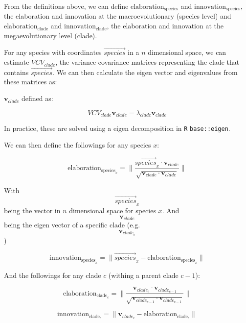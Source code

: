 \documentclass[12pt,a4paper]{article}
\begin{document}
From the definitions above, we can define $\text{elaboration}_{\text{species}}$ and $\text{innovation}_{\text{species}}$, the elaboration and innovation at the macroevolutionary (species level) and $\text{elaboration}_{\text{clade}}$ and $\text{innovation}_{\text{clade}}$, the elaboration and innovation at the megaevolutionary level (clade).

For any species with coordinates $\vec{species}$ in a $n$ dimensional space, we can estimate $VCV_{clade}$, the variance-covariance matrices representing the clade that contains $\vec{species}$.
We can then calculate the eigen vector and eigenvalues from these matrices as: 

$\textbf{v}_{clade}$ defined as:

\begin{equation}
VCV_{clade} \textbf{v}_{clade} = \lambda_{clade} \textbf{v}_{clade}
\end{equation}

In practice, these are solved using a eigen decomposition in \texttt{R} \texttt{base::eigen}.

We can then define the followings for any species $x$:

\begin{equation}
\text{elaboration}_{\text{species}_{x}} = \|\frac{\vec{species}_{x} \cdot \textbf{v}_{clade}} {\sqrt{\textbf{v}_{clade} \cdot \textbf{v}_{clade}}}\|
\end{equation}

With $$\vec{species}_{x}$$ being the vector in $n$ dimensional space for species $x$. And $$\textbf{v}_{clade}$$ being the eigen vector of a specific clade (e.g. $$\textbf{v}_{clade_{c}}$$)

\begin{equation}
\text{innovation}_{\text{species}_{x}} = \| \vec{species}_{x} - \text{elaboration}_{\text{species}_{x}} \|
\end{equation}

And the followings for any clade $c$ (withing a parent clade $c-1$):

\begin{equation}
\text{elaboration}_{\text{clade}_{c}} = \| \frac{\textbf{v}_{clade_{c}} \cdot \textbf{v}_{clade_{c-1}}} {\sqrt{\textbf{v}_{clade_{c-1}} \cdot \textbf{v}_{clade_{c-1}}}}\|
\end{equation}

\begin{equation}
\text{innovation}_{\text{clade}_{c}} = \| \textbf{v}_{clade_{c}} - \text{elaboration}_{\text{clade}_{c}} \|
\end{equation}
\end{document}
